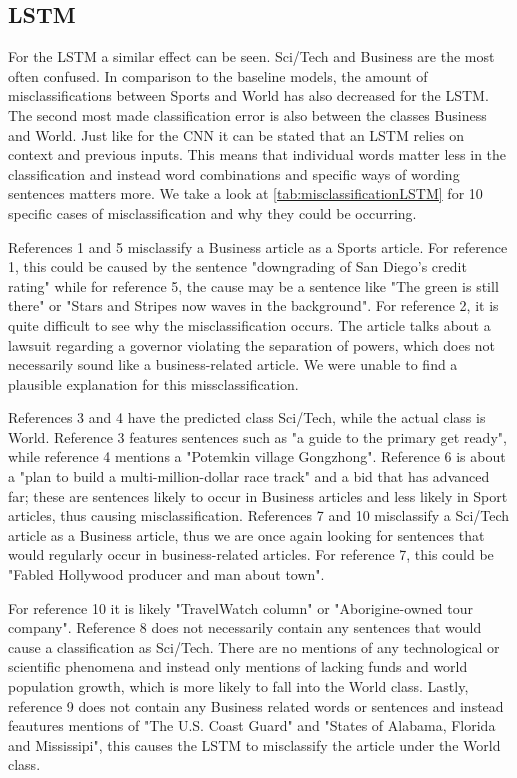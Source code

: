 \documentclass[12pt,a4paper,english]{article}
\begin{document}
\subsection{LSTM}
For the LSTM a similar effect can be seen. Sci/Tech and Business are the most often confused. In comparison to the baseline models, the amount of misclassifications between Sports and World has also decreased for the LSTM. The second most made classification error is also between the classes Business and World. Just like for the CNN it can be stated that an LSTM relies on context and previous inputs. This means that individual words matter less in the classification and instead word combinations and specific ways of wording sentences matters more. We take a look at \ref{tab:misclassificationLSTM} for 10 specific cases of misclassification and why they could be occurring. 

References 1 and 5 misclassify a Business article as a Sports article. For reference 1, this could be caused by the sentence "downgrading of San Diego's credit rating" while for reference 5, the cause may be a sentence like "The green is still there" or "Stars and Stripes now waves in the background". For reference 2, it is quite difficult to see why the misclassification occurs. The article talks about a lawsuit regarding a governor violating the separation of powers, which does not necessarily sound like a business-related article. We were unable to find a plausible explanation for this missclassification. 

References 3 and 4 have the predicted class Sci/Tech, while the actual class is World. Reference 3 features sentences such as "a guide to the primary get ready", while reference 4 mentions a "Potemkin village Gongzhong". Reference 6 is about a "plan to build a multi-million-dollar race track" and a bid that has advanced far; these are sentences likely to occur in Business articles and less likely in Sport articles, thus causing misclassification. References 7 and 10 misclassify a Sci/Tech article as a Business article, thus we are once again looking for sentences that would regularly occur in business-related articles. For reference 7, this could be "Fabled Hollywood producer and man about town".

For reference 10 it is likely "TravelWatch column" or "Aborigine-owned tour company". Reference 8 does not necessarily contain any sentences that would cause a classification as Sci/Tech. There are no mentions of any technological or scientific phenomena and instead only mentions of lacking funds and world population growth, which is more likely to fall into the World class. Lastly, reference 9 does not contain any Business related words or sentences and instead feautures mentions of "The U.S. Coast Guard" and "States of Alabama, Florida and Mississipi", this causes the LSTM to misclassify the article under the World class.
\end{document}
